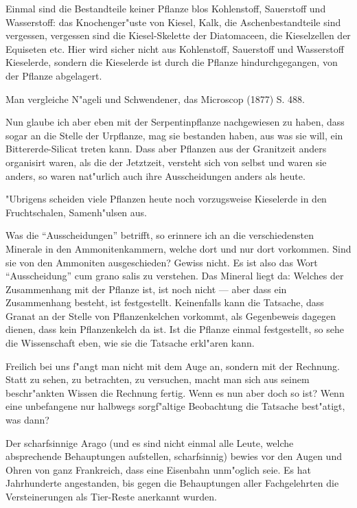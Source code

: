\documentclass[a4paper, 11pt, oneside, german]{article}
\begin{document}
Einmal sind die Bestandteile keiner Pflanze blos Kohlenstoff, Sauerstoff und Wasserstoff: das Knochenger"uste von Kiesel, Kalk, die Aschenbestandteile sind vergessen, vergessen sind die Kiesel-Skelette der Diatomaceen, die Kieselzellen der Equiseten etc. Hier wird sicher nicht aus Kohlenstoff, Sauerstoff und Wasserstoff Kieselerde, sondern die Kieselerde ist durch die Pflanze hindurchgegangen, von der Pflanze abgelagert.

Man vergleiche N"ageli und Schwendener, das Microscop (1877) S. 488.

Nun glaube ich aber eben mit der Serpentinpflanze nachgewiesen zu haben, dass sogar an die Stelle der Urpflanze, mag sie bestanden haben, aus was sie will, ein Bittererde-Silicat treten kann. Dass aber Pflanzen aus der Granitzeit anders organisirt waren, als die der Jetztzeit, versteht sich von selbst und waren sie anders, so waren nat"urlich auch ihre Ausscheidungen anders als heute.

"Ubrigens scheiden viele Pflanzen heute noch vorzugsweise Kieselerde in den Fruchtschalen, Samenh"ulsen aus.

Was die "`Ausscheidungen"' betrifft, so erinnere ich an die verschiedensten Minerale in den Ammonitenkammern, welche dort und nur dort vorkommen. Sind sie von den Ammoniten ausgeschieden? Gewiss nicht. Es ist also das Wort "`Ausscheidung"' cum grano salis zu verstehen. Das Mineral liegt da: Welches der Zusammenhang mit der Pflanze ist, ist noch nicht --- aber dass ein Zusammenhang besteht, ist festgestellt. Keinenfalls kann die Tatsache, dass Granat an der Stelle von Pflanzenkelchen vorkommt, als Gegenbeweis dagegen dienen, dass kein Pflanzenkelch da ist. Ist die Pflanze einmal festgestellt, so sehe die Wissenschaft eben, wie sie die Tatsache erkl"aren kann.

Freilich bei uns f"angt man nicht mit dem Auge an, sondern mit der Rechnung. Statt zu sehen, zu betrachten, zu versuchen, macht man sich aus seinem beschr"ankten Wissen die Rechnung fertig. Wenn es nun aber doch so ist? Wenn eine unbefangene nur halbwegs sorgf"altige Beobachtung die Tatsache best"atigt, was dann?

Der scharfsinnige Arago (und es sind nicht einmal alle Leute, welche absprechende Behauptungen aufstellen, scharfsinnig) bewies vor den Augen und Ohren von ganz Frankreich, dass eine Eisenbahn unm"oglich seie. Es hat Jahrhunderte angestanden, bis gegen die Behauptungen aller Fachgelehrten die Versteinerungen als Tier-Reste anerkannt wurden.
\end{document}
